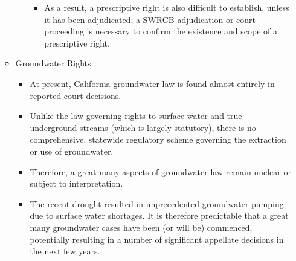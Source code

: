 \documentclass{article}
\begin{document}
\begin{enumerate}
\begin{itemize}
\begin{enumerate}
\begin{itemize}
\item As a result, a prescriptive right is also difficult to establish, unless it has been adjudicated; a SWRCB adjudication or court proceeding is necessary to confirm the existence and scope of a prescriptive right.
\end{itemize} 
\end{enumerate}
\item Groundwater Rights\\
\begin{itemize}
\item At present, California groundwater law is found almost entirely in reported court decisions. 
\item Unlike the law governing rights to surface water and true underground streams (which is largely statutory), there is no comprehensive, statewide regulatory scheme governing the extraction or use of groundwater. 
\item Therefore, a great many aspects of groundwater law remain unclear or subject to interpretation. 
\item The recent drought resulted in unprecedented groundwater pumping due to surface water shortages. It is therefore predictable that a great many groundwater cases have been (or will be) commenced, potentially resulting in a number of significant appellate decisions in the next few years. 

\end{itemize}
\end{itemize}
\end{enumerate}
\end{document}
